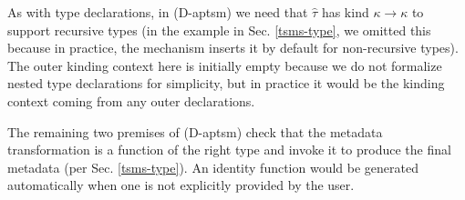 \documentclass{sig-alternate}[10pt]
\begin{document}
As with type declarations, in (D-aptsm) we need that $\hat{\tau}$ has kind $\kappa \rightarrow \kappa$ to support recursive types (in the example in Sec. \ref{tsms-type}, we omitted this because in practice, the mechanism inserts it by default for non-recursive types). The outer kinding context here is initially empty because we do not formalize nested type declarations for simplicity, but in practice it would be the kinding context coming from any outer declarations. 

The remaining two premises of (D-aptsm) check that the metadata transformation is a function of the right type and invoke it to produce the final metadata (per Sec. \ref{tsms-type}). An identity function would be generated automatically when one is not explicitly provided by the user.






\end{document}
